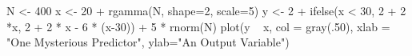\begin{Schunk}
\begin{Sinput}
 N <- 400
 x <- 20 + rgamma(N, shape=2, scale=5)
 y <- 2 + ifelse(x < 30, 2 + 2 *x, 2 + 2 * x - 6 * (x-30)) + 5 * rnorm(N)
 plot(y ~ x, col = gray(.50), xlab = "One Mysterious Predictor", ylab="An Output Variable")
\end{Sinput}
\end{Schunk}
